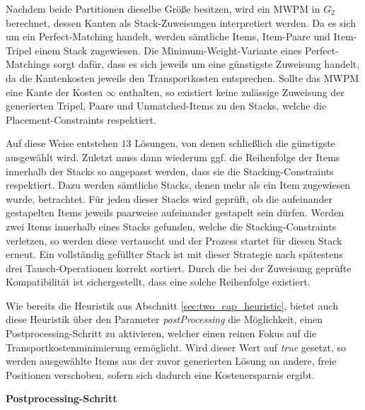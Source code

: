 Nachdem beide Partitionen dieselbe Größe besitzen, wird ein \textsc{MWPM} in $G_2$ berechnet, dessen Kanten
als Stack-Zuweisungen interpretiert werden. Da es sich um ein Perfect-Matching handelt, werden sämtliche Items, Item-Paare
und Item-Tripel einem Stack zugewiesen. Die Minimum-Weight-Variante eines Perfect-Matchings sorgt dafür, dass es sich
jeweils um eine günstigste Zuweisung handelt, da die Kantenkosten jeweils den Transportkosten entsprechen.
Sollte das \textsc{MWPM} eine Kante der Kosten $\infty$ enthalten, so existiert keine zulässige Zuweisung
der generierten Tripel, Paare und Unmatched-Items zu den Stacks, welche die Placement-Constraints respektiert.

Auf diese Weise entstehen $13$ Lösungen, von denen schließlich die günstigste ausgewählt wird.
Zuletzt muss dann wiederum ggf. die Reihenfolge der Items innerhalb der Stacks so angepasst werden,
dass sie die Stacking-Constraints respektiert. Dazu werden sämtliche Stacks, denen mehr als
ein Item zugewiesen wurde, betrachtet. Für jeden dieser Stacks wird geprüft, ob die aufeinander
gestapelten Items jeweils paarweise aufeinander gestapelt sein dürfen.
Werden zwei Items innerhalb eines Stacks gefunden, welche die Stacking-Constraints verletzen, so werden diese
vertauscht und der Prozess startet für diesen Stack erneut. Ein vollständig gefüllter Stack ist mit dieser
Strategie nach spätestens drei Tausch-Operationen korrekt sortiert. Durch die bei der Zuweisung geprüfte
Kompatibilität ist sichergestellt, dass eine solche Reihenfolge existiert.

Wie bereits die Heuristik aus Abschnitt \ref{sec:two_cap_heuristic}, bietet auch diese Heuristik über den Parameter
\textit{postProcessing} die Möglichkeit, einen Postprocessing-Schritt zu aktivieren, welcher einen reinen Fokus
auf die Transportkostenminimierung ermöglicht. Wird dieser Wert auf \textit{true} gesetzt, so werden ausgewählte Items aus der zuvor generierten Lösung an andere, freie Positionen verschoben, sofern sich dadurch eine Kostenersparnis ergibt.

\textbf{Postprocessing-Schritt}

